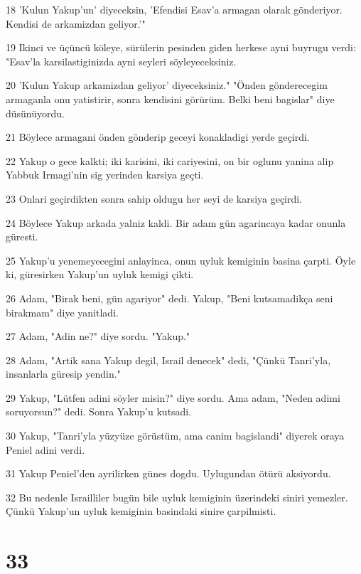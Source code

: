 \par 18 'Kulun Yakup'un' diyeceksin, 'Efendisi Esav'a armagan olarak gönderiyor. Kendisi de arkamizdan geliyor.'"
\par 19 Ikinci ve üçüncü köleye, sürülerin pesinden giden herkese ayni buyrugu verdi: "Esav'la karsilastiginizda ayni seyleri söyleyeceksiniz.
\par 20 'Kulun Yakup arkamizdan geliyor' diyeceksiniz." "Önden gönderecegim armaganla onu yatistirir, sonra kendisini görürüm. Belki beni bagislar" diye düsünüyordu.
\par 21 Böylece armagani önden gönderip geceyi konakladigi yerde geçirdi.
\par 22 Yakup o gece kalkti; iki karisini, iki cariyesini, on bir oglunu yanina alip Yabbuk Irmagi'nin sig yerinden karsiya geçti.
\par 23 Onlari geçirdikten sonra sahip oldugu her seyi de karsiya geçirdi.
\par 24 Böylece Yakup arkada yalniz kaldi. Bir adam gün agarincaya kadar onunla güresti.
\par 25 Yakup'u yenemeyecegini anlayinca, onun uyluk kemiginin basina çarpti. Öyle ki, güresirken Yakup'un uyluk kemigi çikti.
\par 26 Adam, "Birak beni, gün agariyor" dedi. Yakup, "Beni kutsamadikça seni birakmam" diye yanitladi.
\par 27 Adam, "Adin ne?" diye sordu. "Yakup."
\par 28 Adam, "Artik sana Yakup degil, Israil denecek" dedi, "Çünkü Tanri'yla, insanlarla güresip yendin."
\par 29 Yakup, "Lütfen adini söyler misin?" diye sordu. Ama adam, "Neden adimi soruyorsun?" dedi. Sonra Yakup'u kutsadi.
\par 30 Yakup, "Tanri'yla yüzyüze görüstüm, ama canim bagislandi" diyerek oraya Peniel adini verdi.
\par 31 Yakup Peniel'den ayrilirken günes dogdu. Uylugundan ötürü aksiyordu.
\par 32 Bu nedenle Israilliler bugün bile uyluk kemiginin üzerindeki siniri yemezler. Çünkü Yakup'un uyluk kemiginin basindaki sinire çarpilmisti.

\chapter{33}

